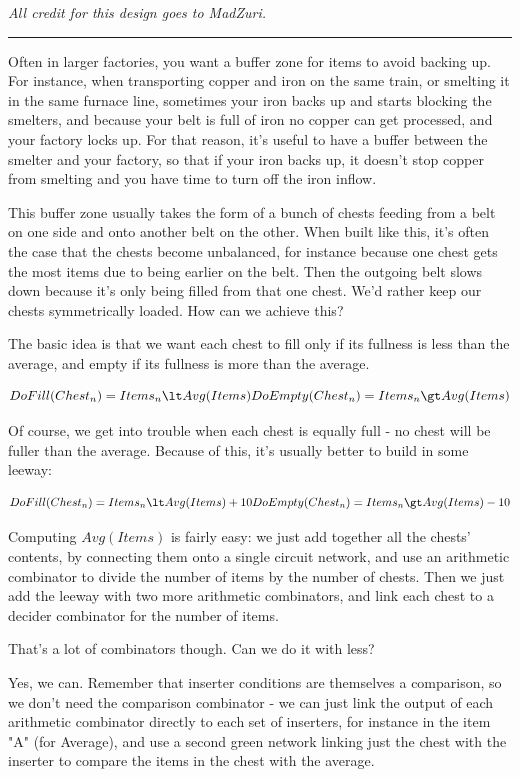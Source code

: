 \documentclass{article}
\begin{document}
\emph{All credit for this design goes to MadZuri.}

\rule{10cm}{1pt}

Often in larger factories, you want a buffer zone for items to avoid backing up. For instance, when transporting copper and iron on the same train, or smelting it in the same furnace line, sometimes your iron backs up and starts blocking the smelters, and because your belt is full of iron no copper can get processed, and your factory locks up. For that reason, it's useful to have a buffer between the smelter and your factory, so that if your iron backs up, it doesn't stop copper from smelting and you have time to turn off the iron inflow.

This buffer zone usually takes the form of a bunch of chests feeding from a belt on one side and onto another belt on the other. When built like this, it's often the case that the chests become unbalanced, for instance because one chest gets the most items due to being earlier on the belt. Then the outgoing belt slows down because it's only being filled from that one chest. We'd rather keep our chests symmetrically loaded. How can we achieve this?

The basic idea is that we want each chest to fill only if its fullness is less than the average, and empty if its fullness is more than the average.

$$
DoFill(Chest_n) = Items_n \lt Avg(Items)\\
DoEmpty(Chest_n) = Items_n \gt Avg(Items)
$$

Of course, we get into trouble when each chest is equally full - no chest will be fuller than the average. Because of this, it's usually better to build in some leeway:

$$
DoFill(Chest_n) = Items_n \lt Avg(Items) + 10\\
DoEmpty(Chest_n) = Items_n \gt Avg(Items) - 10
$$

Computing $Avg(Items)$ is fairly easy: we just add together all the chests' contents, by connecting them
onto a single circuit network, and use an arithmetic combinator to divide the number of items by the number of chests. Then we just add the leeway with two more arithmetic combinators, and link each chest to a decider combinator for the number of items.

That's a lot of combinators though. Can we do it with less?

Yes, we can. Remember that inserter conditions are themselves a comparison, so we don't need the comparison combinator - we can just link the output of each arithmetic combinator directly to each set of inserters, for instance in the item "A" (for Average), and use a second green network linking just the chest with the inserter to compare the items in the chest with the average.
\end{document}
